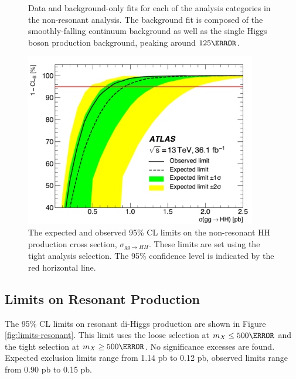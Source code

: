 \begin{figure}[!htbp]
	\caption{Data and background-only fits for each of the analysis categories in the non-resonant analysis. The background fit is composed of the smoothly-falling continuum \yy background as well as the single Higgs boson production background, peaking around $\unit{125}{\GeV}$.}
  \label{fig:results-myy}
\end{figure}


\begin{figure}[!htbp]
  \centering
\includegraphics[width=0.9\textwidth]{chapters/chapter5_yybb/images/limits/nonresonant.pdf}
  \caption[The expected and observed limits on the non-resonant \HH production cross section]
  {The expected and observed 95\% \gls{CL} limits on the non-resonant HH production cross section, $\sigma_{gg\rightarrow HH}$. These limits are set using the tight analysis selection. The 95\% confidence level is indicated by the red horizontal line.}
  \label{fig:limits-nonresonant}
\end{figure}

\subsection{Limits on Resonant Production}

The 95\% \gls{CL} limits on resonant di-Higgs production are shown in Figure \ref{fig:limits-resonant}. This limit uses the loose selection at $m_{X} \leq \unit{500}{\GeV}$ and the tight selection at $m_{X} \geq \unit{500}{\GeV}$. No significance excesses are found. Expected exclusion limits range from 1.14 pb to 0.12 pb, observed limits range from 0.90 pb to 0.15 pb.

